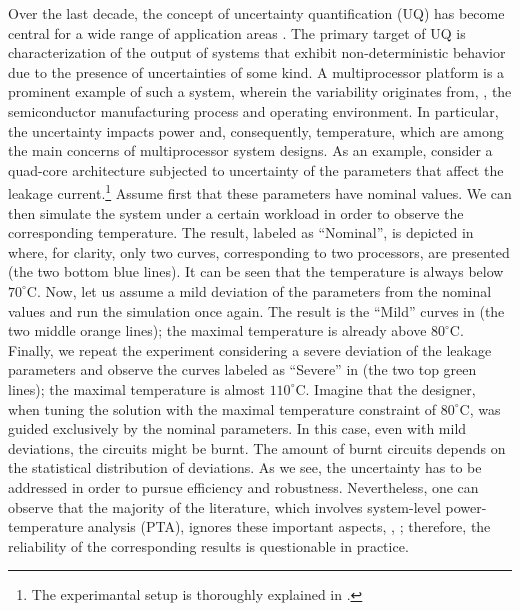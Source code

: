Over the last decade, the concept of uncertainty quantification (UQ) has become central for a wide range of application areas \cite{xiu2010, eldred2009}. The primary target of UQ is characterization of the output of systems that exhibit non-deterministic behavior due to the presence of uncertainties of some kind. A multiprocessor platform is a prominent example of such a system, wherein the variability originates from, \eg, the semiconductor manufacturing process and operating environment. In particular, the uncertainty impacts power and, consequently, temperature, which are among the main concerns of multiprocessor system designs. As an example, consider a quad-core architecture subjected to uncertainty of the parameters that affect the leakage current.\footnote{The experimantal setup is thoroughly explained in .} Assume first that these parameters have nominal values. We can then simulate the system under a certain workload in order to observe the corresponding temperature. The result, labeled as ``Nominal'', is depicted in  where, for clarity, only two curves, corresponding to two processors, are presented (the two bottom blue lines). It can be seen that the temperature is always below $70^{\circ}$C. Now, let us assume a mild deviation of the parameters from the nominal values and run the simulation once again. The result is the ``Mild'' curves in  (the two middle orange lines); the maximal temperature is already above $80^{\circ}$C. Finally, we repeat the experiment considering a severe deviation of the leakage parameters and observe the curves labeled as ``Severe'' in  (the two top green lines); the maximal temperature is almost $110^{\circ}$C. Imagine that the designer, when tuning the solution with the maximal temperature constraint of $80^\circ$C, was guided exclusively by the nominal parameters. In this case, even with mild deviations, the circuits might be burnt. The amount of burnt circuits depends on the statistical distribution of deviations. As we see, the uncertainty has to be addressed in order to pursue efficiency and robustness. Nevertheless, one can observe that the majority of the literature, which involves system-level power-temperature analysis (PTA), ignores these important aspects, \eg, \cite{rao2009, rai2011, thiele2011, ukhov2012}; therefore, the reliability of the corresponding results is questionable in practice.

